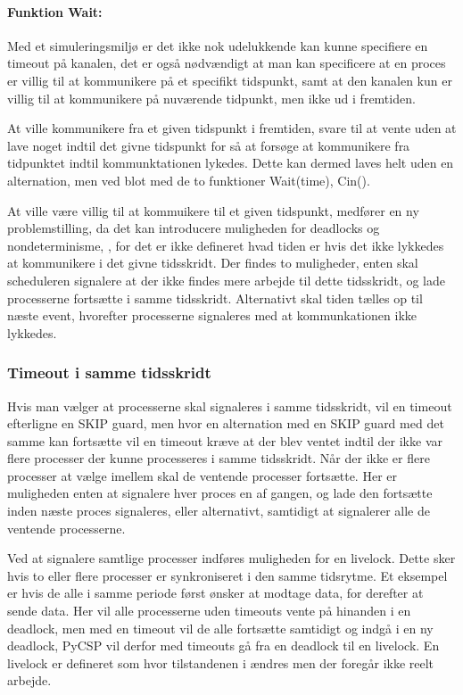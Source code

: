 \paragraph*{Funktion Wait:}

Med et simuleringsmiljø er det ikke nok udelukkende kan kunne specifiere en 
timeout på kanalen, det er også nødvændigt at man kan specificere at en proces 
er villig til at kommunikere på et specifikt tidspunkt, samt at den kanalen 
kun er villig til at kommunikere på nuværende tidpunkt, men ikke ud 
i fremtiden.  

At ville kommunikere fra et given tidspunkt i fremtiden,  svare til at vente 
uden at lave noget indtil det givne tidspunkt for så at forsøge at kommunikere 
fra tidpunktet indtil kommunktationen lykedes. Dette kan dermed laves helt 
uden en alternation, men ved blot med de to funktioner Wait(time), Cin(). 

At ville være villig til at kommuikere til et given tidspunkt, medfører en ny 
problemstilling, da det kan introducere muligheden for deadlocks og 
nondeterminisme, , for det er ikke defineret hvad 
tiden er hvis det ikke lykkedes at kommunikere i det givne tidsskridt. Der 
findes to muligheder, enten skal scheduleren signalere at der ikke findes mere 
arbejde til dette tidsskridt, og lade processerne fortsætte i samme 
tidsskridt. Alternativt skal tiden tælles op til næste event, hvorefter 
processerne signaleres med at kommunkationen ikke lykkedes. 

\subsubsection{Timeout i samme tidsskridt}
Hvis man vælger at processerne skal signaleres i samme tidsskridt, vil en 
timeout efterligne en SKIP guard, men hvor en alternation med en SKIP guard 
med det samme kan fortsætte vil en timeout kræve at der blev ventet indtil der 
ikke var flere processer der kunne processeres i samme tidsskridt. Når der 
ikke er flere processer at vælge imellem skal de ventende processer fortsætte. 
Her er muligheden enten at signalere hver proces en af gangen, og lade den 
fortsætte inden næste proces signaleres, eller alternativt, samtidigt at 
signalerer alle de ventende processerne.

Ved at signalere samtlige processer indføres muligheden for en livelock. Dette
sker hvis to eller flere processer er  synkroniseret i den samme tidsrytme.
Et eksempel er hvis de alle i samme periode først ønsker at modtage data, for 
derefter at sende data. Her vil alle processerne uden timeouts vente på 
hinanden i en deadlock, men med en timeout vil de alle fortsætte samtidigt og 
indgå i en ny deadlock, PyCSP vil derfor med timeouts gå fra en deadlock til 
en livelock. En livelock er defineret som hvor tilstandenen i ændres men der
foregår ikke reelt arbejde. 

